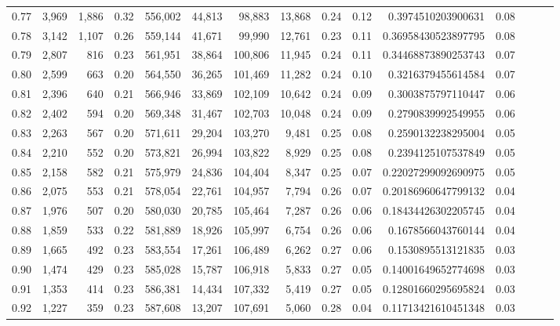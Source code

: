 \begin{tabular}{rrrrrrrrrrrrrrr}
0.77 &   3,969 &  1,886 &  0.32 &  556,002 &   44,813 &   98,883 &   13,868 &  0.24 &  0.12 &    0.3974510203900631 &      0.08 \\
0.78 &   3,142 &  1,107 &  0.26 &  559,144 &   41,671 &   99,990 &   12,761 &  0.23 &  0.11 &   0.36958430523897795 &      0.08 \\
0.79 &   2,807 &    816 &  0.23 &  561,951 &   38,864 &  100,806 &   11,945 &  0.24 &  0.11 &   0.34468873890253743 &      0.07 \\
0.80 &   2,599 &    663 &  0.20 &  564,550 &   36,265 &  101,469 &   11,282 &  0.24 &  0.10 &    0.3216379455614584 &      0.07 \\
0.81 &   2,396 &    640 &  0.21 &  566,946 &   33,869 &  102,109 &   10,642 &  0.24 &  0.09 &    0.3003875797110447 &      0.06 \\
0.82 &   2,402 &    594 &  0.20 &  569,348 &   31,467 &  102,703 &   10,048 &  0.24 &  0.09 &    0.2790839992549955 &      0.06 \\
0.83 &   2,263 &    567 &  0.20 &  571,611 &   29,204 &  103,270 &    9,481 &  0.25 &  0.08 &    0.2590132238295004 &      0.05 \\
0.84 &   2,210 &    552 &  0.20 &  573,821 &   26,994 &  103,822 &    8,929 &  0.25 &  0.08 &    0.2394125107537849 &      0.05 \\
0.85 &   2,158 &    582 &  0.21 &  575,979 &   24,836 &  104,404 &    8,347 &  0.25 &  0.07 &   0.22027299092690975 &      0.05 \\
0.86 &   2,075 &    553 &  0.21 &  578,054 &   22,761 &  104,957 &    7,794 &  0.26 &  0.07 &   0.20186960647799132 &      0.04 \\
0.87 &   1,976 &    507 &  0.20 &  580,030 &   20,785 &  105,464 &    7,287 &  0.26 &  0.06 &   0.18434426302205745 &      0.04 \\
0.88 &   1,859 &    533 &  0.22 &  581,889 &   18,926 &  105,997 &    6,754 &  0.26 &  0.06 &    0.1678566043760144 &      0.04 \\
0.89 &   1,665 &    492 &  0.23 &  583,554 &   17,261 &  106,489 &    6,262 &  0.27 &  0.06 &    0.1530895513121835 &      0.03 \\
0.90 &   1,474 &    429 &  0.23 &  585,028 &   15,787 &  106,918 &    5,833 &  0.27 &  0.05 &   0.14001649652774698 &      0.03 \\
0.91 &   1,353 &    414 &  0.23 &  586,381 &   14,434 &  107,332 &    5,419 &  0.27 &  0.05 &   0.12801660295695824 &      0.03 \\
0.92 &   1,227 &    359 &  0.23 &  587,608 &   13,207 &  107,691 &    5,060 &  0.28 &  0.04 &   0.11713421610451348 &      0.03 \\

\end{tabular}
